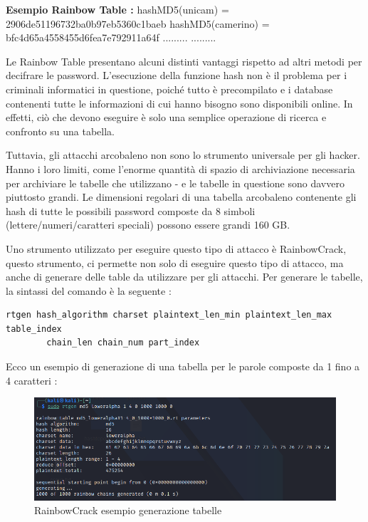 \textbf{Esempio Rainbow Table :}
\newline
\newline
hashMD5(unicam) = 2906de51196732ba0b97eb5360c1baeb\newline
hashMD5(camerino) = bfc4d65a4558455d6fea7e792911a64f\newline
.........\newline
.........\newline

Le Rainbow Table presentano alcuni distinti vantaggi rispetto ad altri metodi per decifrare le password. L'esecuzione della funzione hash non è il problema per i criminali informatici in questione, poiché tutto è precompilato e i database contenenti tutte le informazioni di cui hanno bisogno sono disponibili online. In effetti, ciò che devono eseguire è solo una semplice operazione di ricerca e confronto su una tabella.

Tuttavia, gli attacchi arcobaleno non sono lo strumento universale per gli hacker. Hanno i loro limiti, come l'enorme quantità di spazio di archiviazione necessaria per archiviare le tabelle che utilizzano - e le tabelle in questione sono davvero piuttosto grandi. Le dimensioni regolari di una tabella arcobaleno contenente gli hash di tutte le possibili password composte da 8 simboli (lettere/numeri/caratteri speciali) possono essere grandi 160 GB.

Uno strumento utilizzato per eseguire questo tipo di attacco è RainbowCrack\cite{rainbowcrack}, questo strumento, ci permette non solo di eseguire questo tipo di attacco, ma anche di generare delle table da utilizzare per gli attacchi. Per generare le tabelle, la sintassi del comando è la seguente :

\begin{lstlisting}[caption={Esempio RainbowCrack command}, style=javaScriptCode]
rtgen hash_algorithm charset plaintext_len_min plaintext_len_max table_index 
        chain_len chain_num part_index
\end{lstlisting}

Ecco un esempio di generazione di una tabella per le parole composte da 1 fino a 4 caratteri :

\begin{figure}[h!]
    \centering
    \includegraphics[width=120mm]{Immagini/1/r_1.png}
    \caption{RainbowCrack esempio generazione tabelle}
\end{figure}

